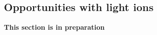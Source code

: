 \subsection{Opportunities with light ions}
\label{sec:jetslightions}

{\bf This section is in preparation} 
